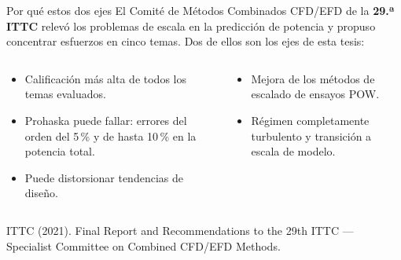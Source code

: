 \documentclass[aspectratio=169,10pt]{beamer}
\newcommand{\fuente}[1]{{\tiny\color{gris}#1}}
\newcommand{\uk}{(1+k)}
\begin{document}
\begin{frame}{Por qué estos dos ejes}
El Comité de Métodos Combinados CFD/EFD de la \textbf{29.ª ITTC} relevó los problemas de escala en la predicción de potencia y propuso concentrar esfuerzos en cinco temas. Dos de ellos son los ejes de esta tesis:
\vspace{0.8em}
\begin{columns}[T]
\begin{dato}[title={\textbf{Eje 1 · Determinación numérica de $\uk$}},colbacktitle=mar,coltitle=white]
\small
\begin{itemize}
  \item Calificación \alert{más alta} de todos los temas evaluados.
  \item Prohaska puede fallar: errores del orden del 5\,\% y de hasta \alert{10\,\% en la potencia total}.
  \item Puede distorsionar tendencias de diseño.
\end{itemize}
\end{dato}
\begin{dato}[title={\textbf{Eje 2 · Escalado de hélices en aguas abiertas}},colbacktitle=mar,coltitle=white]
\small
\begin{itemize}
  \item Mejora de los métodos de escalado de ensayos POW.
  \item Régimen completamente turbulento y \alert{transición} a escala de modelo.
\end{itemize}
\end{dato}
\end{columns}
\vfill
\fuente{ITTC (2021). Final Report and Recommendations to the 29th ITTC — Specialist Committee on Combined CFD/EFD Methods.}
\end{frame}
\end{document}
